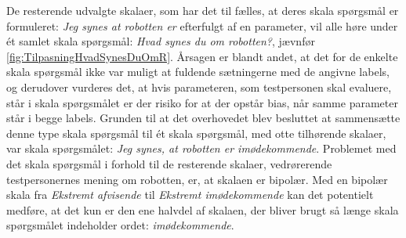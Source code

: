 \noindent
%  
De resterende udvalgte skalaer, som har det til fælles, at deres skala spørgsmål er formuleret: \textit{Jeg synes at robotten er} efterfulgt af en parameter, vil alle høre under ét samlet skala spørgsmål: \textit{Hvad synes du om robotten?}, jævnfør \autoref{fig:TilpasningHvadSynesDuOmR}. Årsagen er blandt andet, at det for de enkelte skala spørgsmål ikke var muligt at fuldende sætningerne med de angivne labels, og derudover vurderes det, at hvis parameteren, som testpersonen skal evaluere, står i skala spørgsmålet er der risiko for at der opstår bias, når samme parameter står i begge labels. Grunden til at det overhovedet blev besluttet at sammensætte denne type skala spørgsmål til ét skala spørgsmål, med otte tilhørende skalaer, var skala spørgsmålet: \textit{Jeg synes, at robotten er imødekommende}. Problemet med det skala spørgsmål i forhold til de resterende skalaer, vedrørerende testpersonernes mening om robotten, er, at skalaen er bipolær. Med en bipolær skala fra \textit{Ekstremt afvisende} til \textit{Ekstremt imødekommende} kan det potentielt medføre, at det kun er den ene halvdel af skalaen, der bliver brugt så længe skala spørgsmålet indeholder ordet: \textit{imødekommende}. 

